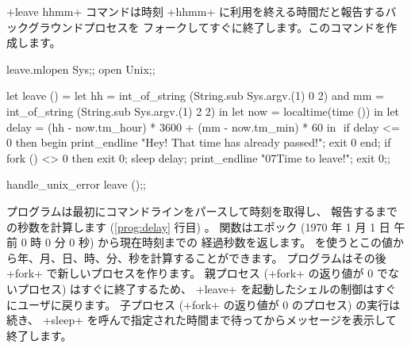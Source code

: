 \ml+leave hhmm+ コマンドは時刻 \ml+hhmm+ に利用を終える時間だと報告するバックグラウンドプロセスを
フォークしてすぐに終了します。このコマンドを作成します。
%
\begin{listingcodefile}[style=numbers]{leave.ml}open Sys;;
open Unix;;

let leave () =
 let hh = int_of_string (String.sub Sys.argv.(1) 0 2)
 and mm = int_of_string (String.sub Sys.argv.(1) 2 2) in
 let now = localtime(time ()) in
 let delay = (hh - now.tm_hour) * 3600 + (mm - now.tm_min) * 60 in
$\label{prog:delay}$
 if delay <= 0 then begin
   print_endline "Hey! That time has already passed!";
   exit 0
 end;
 if fork () <> 0 then exit 0;
 sleep delay;
 print_endline "\007Time to leave!";
 exit 0;;

handle_unix_error leave ();;
\end{listingcodefile}
%
プログラムは最初にコマンドラインをパースして時刻を取得し、
報告するまでの秒数を計算します (\ref{prog:delay} 行目) 。
 関数はエポック (1970 年 1 月 1 日 午前 0 時 0 分 0 秒) から現在時刻までの
経過秒数を返します。  を使うとこの値から年、月、日、時、分、秒を計算することができます。
プログラムはその後 \ml+fork+ で新しいプロセスを作ります。
親プロセス (\ml+fork+ の返り値が 0 でないプロセス) はすぐに終了するため、
\ml+leave+ を起動したシェルの制御はすぐにユーザに戻ります。
子プロセス (\ml+fork+ の返り値が 0 のプロセス) の実行は続き、
\ml+sleep+ を呼んで指定された時間まで待ってからメッセージを表示して終了します。

